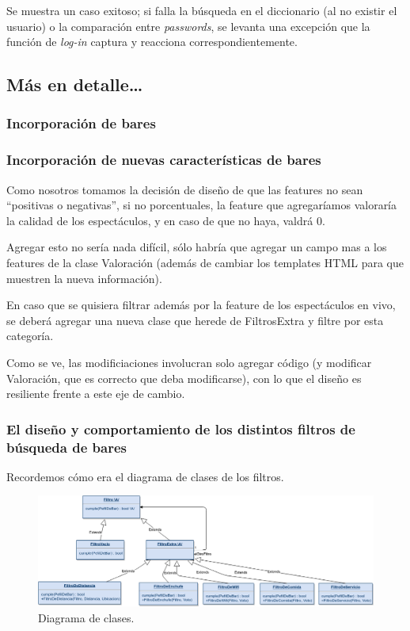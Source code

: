 \par Se muestra un caso exitoso; si falla la búsqueda en el diccionario (al no existir el usuario) o la comparación entre \textit{passwords}, se levanta una excepción que la función de \textit{log-in} captura y reacciona correspondientemente.

\subsection{Más en detalle\ldots}

\subsubsection{Incorporación de bares}

\subsubsection{Incorporación de nuevas características de bares}

Como nosotros tomamos la decisión de diseño de que las features no sean ``positivas o negativas'', si no porcentuales, la feature que agregaríamos valoraría la calidad de los espectáculos, y en caso de que no haya, valdrá 0.

Agregar esto no sería nada difícil, sólo habría que agregar un campo mas a los features de la clase Valoración (además de cambiar los templates HTML para que muestren la nueva información).

En caso que se quisiera filtrar además por la feature de los espectáculos en vivo, se deberá agregar una nueva clase que herede de FiltrosExtra y filtre por esta categoría.

Como se ve, las modificiaciones involucran solo agregar código (y modificar Valoración, que es correcto que deba modificarse), con lo que el diseño es resiliente frente a este eje de cambio.

\subsubsection{El diseño y comportamiento de los distintos filtros de búsqueda de bares}

Recordemos cómo era el diagrama de clases de los filtros.

\begin{figure}[H]
  \centering
  \includegraphics[width=\textwidth]{diagramas/filtro_clases.png}
  \caption{\normalfont Diagrama de clases.}
\end{figure}


